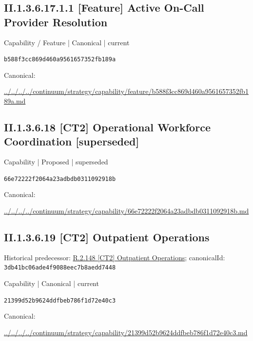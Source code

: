 \documentclass[10pt,a4paper]{article}
\begin{document}
\subsection*{II.1.3.6.17.1.1 [Feature] Active On-Call Provider Resolution}
\label{element-b588f3cc869d460a9561657352fb189a}
{\small Capability / Feature | Canonical | current}\par
\texttt{b588f3cc869d460a9561657352fb189a}\par
Canonical: \par
{\footnotesize\url{../../../../continuum/strategy/capability/feature/b588f3cc869d460a9561657352fb189a.md}}\par
\subsection*{II.1.3.6.18 [CT2] Operational Workforce Coordination [superseded]}
\label{element-66e72222f2064a23adbdb0311092918b}
{\small Capability | Proposed | superseded}\par
\texttt{66e72222f2064a23adbdb0311092918b}\par
Canonical: \par
{\footnotesize\url{../../../../continuum/strategy/capability/66e72222f2064a23adbdb0311092918b.md}}\par
\subsection*{II.1.3.6.19 [CT2] Outpatient Operations}
Historical predecessor: \hyperref[element-3db41bc06ade4f9088eec7b8aedd7448]{R.2.148 [CT2] Outpatient Operations}; canonicalId: \texttt{3db41bc06ade4f9088eec7b8aedd7448}\par
\label{element-21399d52b9624ddfbeb786f1d72e40c3}
{\small Capability | Canonical | current}\par
\texttt{21399d52b9624ddfbeb786f1d72e40c3}\par
Canonical: \par
{\footnotesize\url{../../../../continuum/strategy/capability/21399d52b9624ddfbeb786f1d72e40c3.md}}\par
\end{document}
